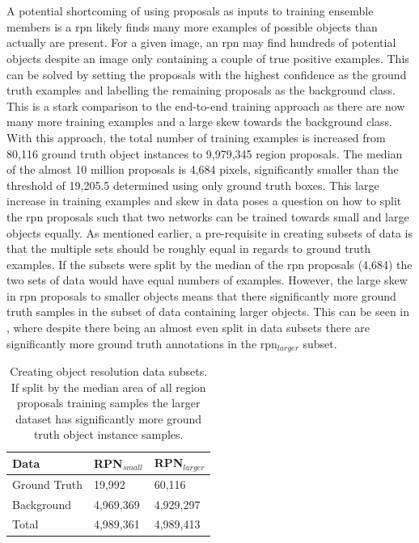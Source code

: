\\\\
A potential shortcoming of using proposals as inputs to training ensemble members is a \gls{rpn} likely finds many more examples of possible objects than actually are present. For a given image, an \gls{rpn} may find hundreds of potential objects despite an image only containing a couple of true positive examples. This can be solved by setting the proposals with the highest confidence as the ground truth examples and labelling the remaining proposals as the background class. This is a stark comparison to the end-to-end training approach as there are now many more training examples and a large skew towards the background class. With this approach, the total number of training examples is increased from 80,116 ground truth object instances to 9,979,345 region proposals. The median of the almost 10 million proposals is 4,684 pixels, significantly smaller than the threshold of 19,205.5 determined using only ground truth boxes. This large increase in training examples and skew in data poses a question on how to split the \gls{rpn} proposals such that two networks can be trained towards small and large objects equally. As mentioned earlier, a pre-requisite in creating subsets of data is that the multiple sets should be roughly equal in regards to ground truth examples. If the subsets were split by the median of the \gls{rpn} proposals (4,684) the two sets of data would have equal numbers of examples. However, the large skew in \gls{rpn} proposals to smaller objects means that there significantly more ground truth samples in the subset of data containing larger objects. This can be seen in , where despite there being an almost even split in data subsets there are significantly more ground truth annotations in the \gls{rpn}$_{larger}$ subset.

\begin{table}[h]
\centering
\caption{Creating object resolution data subsets. If split by the median area of all region proposals training samples the larger dataset has significantly more ground truth object instance samples.}
\label{tab:splitrpn}
\begin{tabular}{|l|l|l|}
\hline
\textbf{Data} & \textbf{RPN$_{small}$} & \textbf{RPN$_{larger}$} \\ \hline
Ground Truth & 19,992    & 60,116     \\ 
Background   & 4,969,369 & 4,929,297  \\ \hline
Total        & 4,989,361 & 4,989,413  \\ \hline
\end{tabular}
\end{table}

